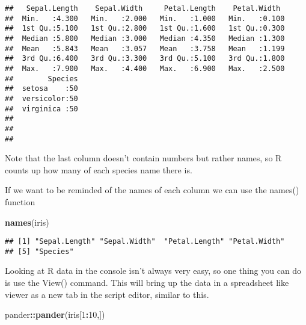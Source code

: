 \documentclass[]{book}
\newenvironment{Shaded}{\begin{snugshade}}{\end{snugshade}}
\newcommand{\KeywordTok}[1]{\textcolor[rgb]{0.13,0.29,0.53}{\textbf{#1}}}
\newcommand{\DecValTok}[1]{\textcolor[rgb]{0.00,0.00,0.81}{#1}}
\newcommand{\OperatorTok}[1]{\textcolor[rgb]{0.81,0.36,0.00}{\textbf{#1}}}
\newcommand{\NormalTok}[1]{#1}
\theoremstyle{definition}
\theoremstyle{definition}
\theoremstyle{definition}
\theoremstyle{remark}
\begin{document}
\begin{verbatim}
##   Sepal.Length    Sepal.Width     Petal.Length    Petal.Width   
##  Min.   :4.300   Min.   :2.000   Min.   :1.000   Min.   :0.100  
##  1st Qu.:5.100   1st Qu.:2.800   1st Qu.:1.600   1st Qu.:0.300  
##  Median :5.800   Median :3.000   Median :4.350   Median :1.300  
##  Mean   :5.843   Mean   :3.057   Mean   :3.758   Mean   :1.199  
##  3rd Qu.:6.400   3rd Qu.:3.300   3rd Qu.:5.100   3rd Qu.:1.800  
##  Max.   :7.900   Max.   :4.400   Max.   :6.900   Max.   :2.500  
##        Species  
##  setosa    :50  
##  versicolor:50  
##  virginica :50  
##                 
##                 
## 
\end{verbatim}

Note that the last column doesn't contain numbers but rather names, so R
counts up how many of each species name there is.

If we want to be reminded of the names of each column we can use the
names() function

\begin{Shaded}
\begin{Highlighting}[]
\KeywordTok{names}\NormalTok{(iris)}
\end{Highlighting}
\end{Shaded}

\begin{verbatim}
## [1] "Sepal.Length" "Sepal.Width"  "Petal.Length" "Petal.Width" 
## [5] "Species"
\end{verbatim}

Looking at R data in the console isn't always very easy, so one thing
you can do is use the View() command. This will bring up the data in a
spreadsheet like viewer as a new tab in the script editor, similar to
this.

\begin{Shaded}
\begin{Highlighting}[]
\NormalTok{pander}\OperatorTok{::}\KeywordTok{pander}\NormalTok{(iris[}\DecValTok{1}\OperatorTok{:}\DecValTok{10}\NormalTok{,])}
\end{Highlighting}
\end{Shaded}
\end{document}
